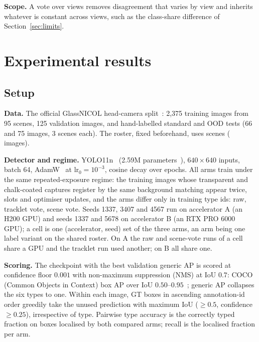 \documentclass{article}
\begin{document}
\noindent\textbf{Scope.} A vote over views removes disagreement that varies by view and inherits whatever is constant across views, such as the class-share difference of Section~\ref{sec:limits}.

\section{Experimental results}
\label{sec:results}
\subsection{Setup}
\label{sec:setup}
\noindent\textbf{Data.} The official GlassNICOL head-camera split~\cite{gajdosech2025glassnicol}: 2,375 training images from 95 scenes, 125 validation images, and hand-labelled standard and OOD tests (66 and 75 images, 3 scenes each). The roster, fixed beforehand, uses \ScenesTrain{} scenes (\ImagesTrainScene{} images).

\noindent\textbf{Detector and regime.} YOLO11n~\cite{jocher2024yolo11} (2.59M parameters~\cite{sapkota2025yolo}), $640\!\times\!640$ inputs, batch 64, AdamW~\cite{loshchilov2019adamw} at $\mathrm{lr}_0=10^{-3}$, cosine decay over \SceneEpochs{} epochs. All arms train under the same repeated-exposure regime: the \SceneRepeatSlots{} training images whose transparent and chalk-coated captures register by the same background matching appear twice, \SceneSlots{} slots and \SceneUpdates{} optimiser updates, and the arms differ only in training type ids: raw, tracklet vote, scene vote. Seeds 1337, 3407 and 4567 run on accelerator A (an H200 GPU) and seeds 1337 and 5678 on accelerator B (an RTX PRO 6000 GPU); a cell is one (accelerator, seed) set of the three arms, an arm being one label variant on the shared roster. On A the raw and scene-vote runs of a cell share a GPU and the tracklet run used another; on B all share one.

\noindent\textbf{Scoring.} The checkpoint with the best validation generic AP is scored at confidence floor $0.001$ with non-maximum suppression (NMS) at IoU $0.7$: COCO (Common Objects in Context) box AP over IoU $0.50$--$0.95$~\cite{lin2014coco}; generic AP collapses the six types to one. Within each image, GT boxes in ascending annotation-id order greedily take the unused prediction with maximum IoU ($\geq0.5$, confidence $\geq0.25$), irrespective of type. Pairwise type accuracy is the correctly typed fraction on boxes localised by both compared arms; recall is the localised fraction per arm.
\end{document}
